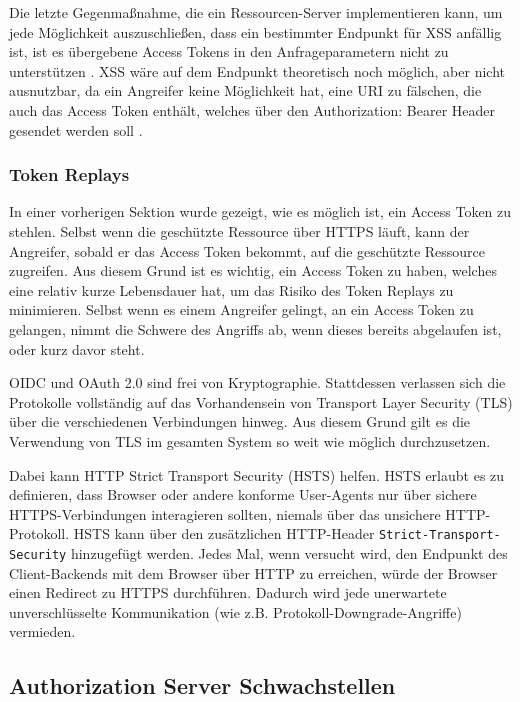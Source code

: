 Die letzte Gegenmaßnahme, die ein Ressourcen-Server implementieren kann, um jede Möglichkeit auszuschließen, dass ein bestimmter Endpunkt für XSS anfällig ist, ist es übergebene Access Tokens in den Anfrageparametern nicht zu unterstützen \cite{OAuth2inAction}. XSS wäre auf dem Endpunkt theoretisch noch möglich, aber nicht ausnutzbar, da ein Angreifer keine Möglichkeit hat, eine URI zu fälschen, die auch das Access Token enthält, welches über den Authorization: Bearer Header gesendet werden soll \cite{OAuth2inAction}.


\subsubsection{Token Replays}

In einer vorherigen Sektion wurde gezeigt, wie es möglich ist, ein Access Token zu stehlen. Selbst wenn die geschützte Ressource über HTTPS läuft, kann der Angreifer, sobald er das Access Token bekommt, auf die geschützte Ressource zugreifen. Aus diesem Grund ist es wichtig, ein Access Token zu haben, welches eine relativ kurze Lebensdauer hat, um das Risiko des Token Replays zu minimieren. Selbst wenn es einem Angreifer gelingt, an ein Access Token zu gelangen, nimmt die Schwere des Angriffs ab, wenn dieses bereits abgelaufen ist, oder kurz davor steht. \cite{OAuth2inAction}

OIDC und OAuth 2.0 sind frei von Kryptographie. Stattdessen verlassen sich die Protokolle vollständig auf das Vorhandensein von Transport Layer Security (TLS) über die verschiedenen Verbindungen hinweg. Aus diesem Grund gilt es die Verwendung von TLS im gesamten System so weit wie möglich durchzusetzen. \cite{OAuth2inAction}

Dabei kann HTTP Strict Transport Security (HSTS) helfen. HSTS erlaubt es zu definieren, dass Browser oder andere konforme User-Agents nur über sichere HTTPS-Verbindungen interagieren sollten, niemals über das unsichere HTTP-Protokoll. HSTS kann über den zusätzlichen HTTP-Header \texttt{Strict-Transport-Security} hinzugefügt werden. Jedes Mal, wenn versucht wird, den Endpunkt des Client-Backends mit dem Browser über HTTP zu erreichen, würde der Browser einen Redirect zu HTTPS durchführen. Dadurch wird jede unerwartete unverschlüsselte Kommunikation (wie z.B. Protokoll-Downgrade-Angriffe) vermieden. \cite{OAuth2inAction}

\subsection{Authorization Server Schwachstellen}

